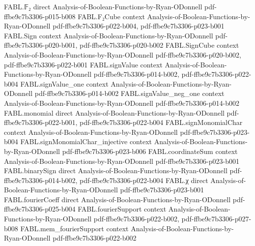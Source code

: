 \begin{theorem}
\label{FABL.threeQueryPCPPDescription_queryCount}
\leanok
{}
\proofstep
  {FABL.𝔽₂}
  {direct}
  {Analysis-of-Boolean-Functions-by-Ryan-ODonnell}
  {pdf-ffbe9c7b3306-p015-b008}
\proofstep
  {FABL.F₂Cube}
  {context}
  {Analysis-of-Boolean-Functions-by-Ryan-ODonnell}
  {pdf-ffbe9c7b3306-p022-b004,
    pdf-ffbe9c7b3306-p023-b001}
\proofstep
  {FABL.Sign}
  {context}
  {Analysis-of-Boolean-Functions-by-Ryan-ODonnell}
  {pdf-ffbe9c7b3306-p020-b001,
    pdf-ffbe9c7b3306-p020-b002}
\proofstep
  {FABL.SignCube}
  {context}
  {Analysis-of-Boolean-Functions-by-Ryan-ODonnell}
  {pdf-ffbe9c7b3306-p020-b002,
    pdf-ffbe9c7b3306-p022-b001}
\proofstep
  {FABL.signValue}
  {context}
  {Analysis-of-Boolean-Functions-by-Ryan-ODonnell}
  {pdf-ffbe9c7b3306-p014-b002,
    pdf-ffbe9c7b3306-p022-b004}
\proofstep
  {FABL.signValue_one}
  {context}
  {Analysis-of-Boolean-Functions-by-Ryan-ODonnell}
  {pdf-ffbe9c7b3306-p014-b002}
\proofstep
  {FABL.signValue_neg_one}
  {context}
  {Analysis-of-Boolean-Functions-by-Ryan-ODonnell}
  {pdf-ffbe9c7b3306-p014-b002}
\proofstep
  {FABL.monomial}
  {direct}
  {Analysis-of-Boolean-Functions-by-Ryan-ODonnell}
  {pdf-ffbe9c7b3306-p022-b001,
    pdf-ffbe9c7b3306-p022-b004}
\proofstep
  {FABL.signMonomialChar}
  {context}
  {Analysis-of-Boolean-Functions-by-Ryan-ODonnell}
  {pdf-ffbe9c7b3306-p023-b004}
\proofstep
  {FABL.signMonomialChar_injective}
  {context}
  {Analysis-of-Boolean-Functions-by-Ryan-ODonnell}
  {pdf-ffbe9c7b3306-p023-b006}
\proofstep
  {FABL.coordinateSum}
  {context}
  {Analysis-of-Boolean-Functions-by-Ryan-ODonnell}
  {pdf-ffbe9c7b3306-p023-b001}
\proofstep
  {FABL.binarySign}
  {direct}
  {Analysis-of-Boolean-Functions-by-Ryan-ODonnell}
  {pdf-ffbe9c7b3306-p014-b002,
    pdf-ffbe9c7b3306-p022-b004}
\proofstep
  {FABL.χ}
  {direct}
  {Analysis-of-Boolean-Functions-by-Ryan-ODonnell}
  {pdf-ffbe9c7b3306-p023-b001}
\proofstep
  {FABL.fourierCoeff}
  {direct}
  {Analysis-of-Boolean-Functions-by-Ryan-ODonnell}
  {pdf-ffbe9c7b3306-p025-b004}
\proofstep
  {FABL.fourierSupport}
  {context}
  {Analysis-of-Boolean-Functions-by-Ryan-ODonnell}
  {pdf-ffbe9c7b3306-p022-b002,
    pdf-ffbe9c7b3306-p027-b008}
\proofstep
  {FABL.mem_fourierSupport}
  {context}
  {Analysis-of-Boolean-Functions-by-Ryan-ODonnell}
  {pdf-ffbe9c7b3306-p022-b002}

\end{theorem}
